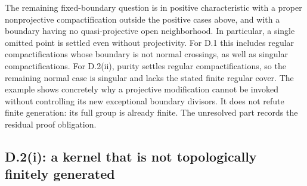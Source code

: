 The remaining fixed-boundary question is in positive characteristic
with a proper nonprojective compactification outside the positive
cases above, and with a boundary having no quasi-projective open
neighborhood. In particular, a single omitted point is settled even
without projectivity. For D.1 this includes regular compactifications whose
boundary is not normal crossings, as well as singular compactifications.
For D.2(ii), purity settles regular compactifications, so the
remaining normal case is singular and lacks the stated finite regular cover.
The example shows concretely why a projective modification cannot
be invoked without controlling its new exceptional boundary divisors.
It does not refute finite generation: its full group is already finite.
The unresolved part records the residual proof obligation.

\subsection{D.2(i): a kernel that is not topologically finitely generated}

